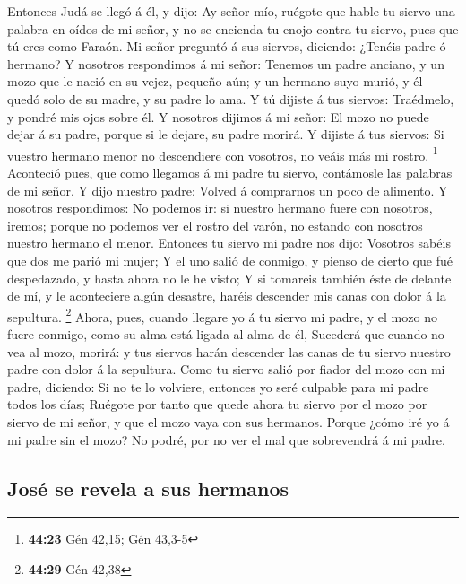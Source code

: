  Entonces Judá se llegó á él, y dijo: Ay señor mío, ruégote
que hable tu siervo una palabra en oídos de mi señor, y no se encienda
tu enojo contra tu siervo, pues que tú eres como Faraón. 
Mi señor preguntó á sus siervos, diciendo: ¿Tenéis padre ó hermano?
 Y nosotros respondimos á mi señor: Tenemos un padre
anciano, y un mozo que le nació en su vejez, pequeño aún; y un hermano
suyo murió, y él quedó solo de su madre, y su padre lo ama.
 Y tú dijiste á tus siervos: Traédmelo, y pondré mis ojos
sobre él.  Y nosotros dijimos á mi señor: El mozo no puede
dejar á su padre, porque si le dejare, su padre morirá.  Y
dijiste á tus siervos: Si vuestro hermano menor no descendiere con
vosotros, no veáis más mi rostro. \footnote{\textbf{44:23} Gén 42,15;
  Gén 43,3-5}  Aconteció pues, que como llegamos á mi padre
tu siervo, contámosle las palabras de mi señor.  Y dijo
nuestro padre: Volved á comprarnos un poco de alimento.  Y
nosotros respondimos: No podemos ir: si nuestro hermano fuere con
nosotros, iremos; porque no podemos ver el rostro del varón, no estando
con nosotros nuestro hermano el menor.  Entonces tu siervo
mi padre nos dijo: Vosotros sabéis que dos me parió mi mujer;
 Y el uno salió de conmigo, y pienso de cierto que fué
despedazado, y hasta ahora no le he visto;  Y si tomareis
también éste de delante de mí, y le aconteciere algún desastre, haréis
descender mis canas con dolor á la sepultura. \footnote{\textbf{44:29}
  Gén 42,38}  Ahora, pues, cuando llegare yo á tu siervo mi
padre, y el mozo no fuere conmigo, como su alma está ligada al alma de
él,  Sucederá que cuando no vea al mozo, morirá: y tus
siervos harán descender las canas de tu siervo nuestro padre con dolor á
la sepultura.  Como tu siervo salió por fiador del mozo con
mi padre, diciendo: Si no te lo volviere, entonces yo seré culpable para
mi padre todos los días;  Ruégote por tanto que quede ahora
tu siervo por el mozo por siervo de mi señor, y que el mozo vaya con sus
hermanos.  Porque ¿cómo iré yo á mi padre sin el mozo? No
podré, por no ver el mal que sobrevendrá á mi padre.

\hypertarget{josuxe9-se-revela-a-sus-hermanos}{%
\subsection{José se revela a sus
hermanos}\label{josuxe9-se-revela-a-sus-hermanos}}

